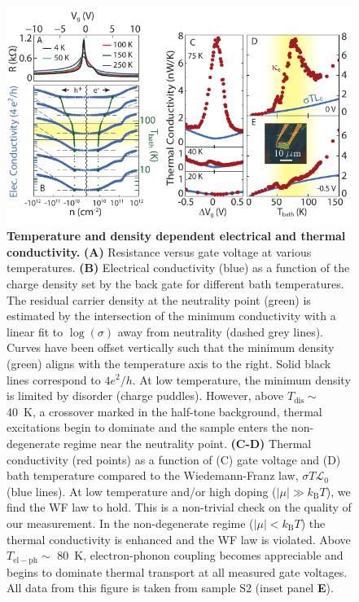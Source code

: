 \begin{figure}
\centering
\includegraphics[width=130mm]{figures/Dirac_fluid/Fig1.pdf}
\caption{\textbf{Temperature and density dependent electrical and thermal conductivity.} \textbf{(A)} Resistance versus gate voltage at various temperatures. \textbf{(B)} Electrical conductivity (blue) as a function of the charge density set by the back gate for different bath temperatures. The residual carrier density at the neutrality point (green) is estimated by the intersection of the minimum conductivity with a linear fit to $\log(\sigma)$ away from neutrality (dashed grey lines). Curves have been offset vertically such that the minimum density (green) aligns with the temperature axis to the right. Solid black lines correspond to $4e^2/h$. At low temperature, the minimum density is limited by disorder (charge puddles). However, above $T_{\mathrm{dis}}\sim$ 40~K, a crossover marked in the half-tone background, thermal excitations begin to dominate and the sample enters the non-degenerate regime near the neutrality point. \textbf{(C-D)} Thermal conductivity (red points) as a function of (C) gate voltage and (D) bath temperature compared to the Wiedemann-Franz law, $\sigma T\mathcal{L}_0$ (blue lines).  At low temperature and/or high doping ($|\mu| \gg k_{\mathrm{B}}T$), we find the WF law to hold.  This is a non-trivial check on the quality of our measurement. In the non-degenerate regime ($|\mu|<k_{\mathrm{B}}T$) the thermal conductivity is enhanced and the WF law is violated. Above $T_{\mathrm{el-ph}}\sim$ 80~K, electron-phonon coupling becomes appreciable and begins to dominate thermal transport at all measured gate voltages.   All data from this figure is taken from sample S2 (inset panel \textbf{E}).}
\label{fig:DF_Fig1}
\end{figure}

